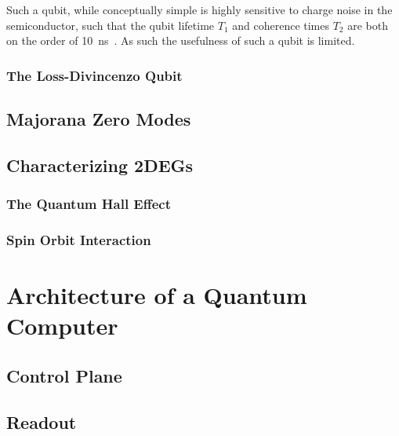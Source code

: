 Such a qubit, while conceptually simple is highly sensitive to charge noise in the semiconductor, such that the qubit lifetime $T_1$ and
coherence times $T_2$ are both on the order of \SI{10}{\nano\second}~\cite{PhysRevLett.105.246804}. As such the usefulness of such a qubit
is limited.

\subsubsection{The Loss-Divincenzo Qubit}

\subsection{Majorana Zero Modes}
\label{sec:majo}


\subsection{Characterizing 2DEGs}
\label{sec:char}
\subsubsection{The Quantum Hall Effect}
\subsubsection{Spin Orbit Interaction}

\section{Architecture of a Quantum Computer}
\label{sec:arch}
  \subsection{Control Plane}
  \subsection{Readout}
  \label{sec:readout}